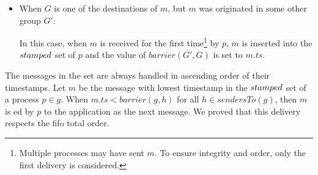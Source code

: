 \documentclass[times, 10pt]{article}
\begin{document}
\begin{itemize}
  
  \item When $G$ is one of the destinations of $m$, but $m$ was originated in some other group $G'$:
  
  In this case, when $m$ is received for the first time\footnote{Multiple processes may have sent $m$. To ensure integrity and order, only the first delivery is considered.} by $p$, $m$ is inserted into the $stamped$ set of $p$ and the value of $barrier(G',G)$ is set to $m.ts$.
\end{itemize}

The messages in the \textit{\stamped} set are always handled in ascending order of their timestamps. Let $m$ be the message with lowest timestamp in the $stamped$ set of a process $p \in g$. When $m.ts < barrier(g, h)$ for all $h \in sendersTo(g)$, then $m$ is \amdel{}ed by $p$ to the application as the next message. We proved that this delivery respects the fifo total order.

\end{document}
